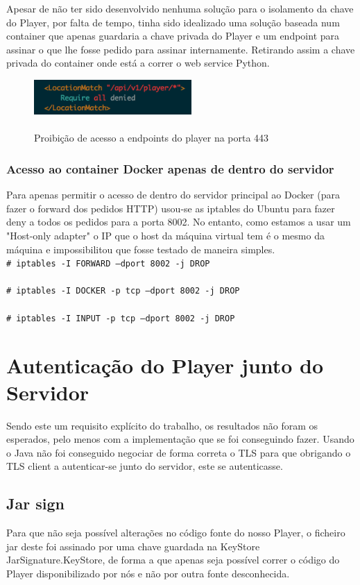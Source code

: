 \documentclass[pdftex,12pt,a4paper]{report}
\newcommand{\shellcmd}[1]{\\\indent\indent\texttt{\footnotesize\# #1}\\}
\begin{document}
Apesar de não ter sido desenvolvido nenhuma solução para o isolamento da chave do Player, por falta de tempo, tinha sido idealizado uma solução baseada num container que apenas guardaria a chave privada do Player e um endpoint para assinar o que lhe fosse pedido para assinar internamente. Retirando assim a chave privada do container onde está a correr o web service Python.

\begin{figure}[!htb]
\center
 \includegraphics[width=60mm,scale=1]{player_denied.png}
 \caption{\\Proibição de acesso a endpoints do player na porta 443}
 \label{fig:docker_c}
\end{figure}

\subsubsection{Acesso ao container Docker apenas de dentro do servidor}

Para apenas permitir o acesso de dentro do servidor principal ao Docker (para fazer o forward dos pedidos HTTP) usou-se as iptables do Ubuntu para fazer deny a todos os pedidos para a porta 8002. No entanto, como estamos a usar um "Host-only adapter" o IP que o host da máquina virtual tem é o mesmo da máquina e impossibilitou que fosse testado de maneira simples.
\shellcmd{iptables -I FORWARD  --dport 8002 -j DROP}
\shellcmd{iptables -I DOCKER -p tcp --dport 8002 -j DROP}
\shellcmd{iptables -I INPUT -p tcp --dport 8002 -j DROP}

\section{Autenticação do Player junto do Servidor}

Sendo este um requisito explícito do trabalho, os resultados não foram os esperados, pelo menos com a implementação que se foi conseguindo fazer. Usando o Java não foi conseguido negociar de forma correta o TLS para que obrigando o TLS client a autenticar-se junto do servidor, este se autenticasse.

\subsection{Jar sign}
Para que não seja possível alterações no código fonte do nosso Player, o ficheiro jar deste foi assinado por uma chave guardada na KeyStore JarSignature.KeyStore, de forma a que apenas seja possível correr o código do Player disponibilizado por nós e não por outra fonte desconhecida.
\end{document}
